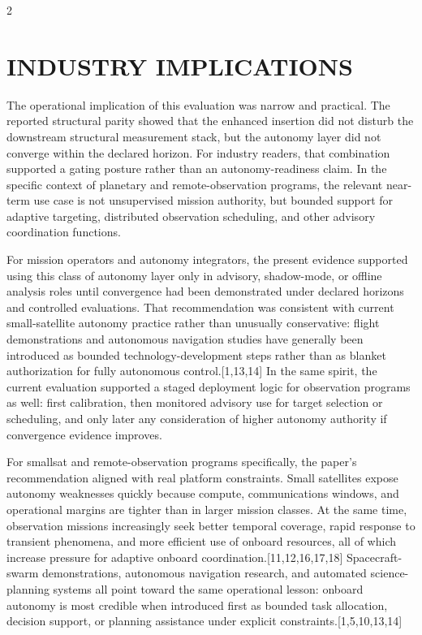 \documentclass[fleqn,10pt,letterpaper]{article}
\begin{document}
\begin{multicols}{2}
\section{INDUSTRY IMPLICATIONS}

The operational implication of this evaluation was narrow and practical. The reported structural parity showed that the enhanced insertion did not disturb the downstream structural measurement stack, but the autonomy layer did not converge within the declared horizon. For industry readers, that combination supported a gating posture rather than an autonomy-readiness claim. In the specific context of planetary and remote-observation programs, the relevant near-term use case is not unsupervised mission authority, but bounded support for adaptive targeting, distributed observation scheduling, and other advisory coordination functions.

For mission operators and autonomy integrators, the present evidence supported using this class of autonomy layer only in advisory, shadow-mode, or offline analysis roles until convergence had been demonstrated under declared horizons and controlled evaluations. That recommendation was consistent with current small-satellite autonomy practice rather than unusually conservative: flight demonstrations and autonomous navigation studies have generally been introduced as bounded technology-development steps rather than as blanket authorization for fully autonomous control.[1,13,14] In the same spirit, the current evaluation supported a staged deployment logic for observation programs as well: first calibration, then monitored advisory use for target selection or scheduling, and only later any consideration of higher autonomy authority if convergence evidence improves.

For smallsat and remote-observation programs specifically, the paper's recommendation aligned with real platform constraints. Small satellites expose autonomy weaknesses quickly because compute, communications windows, and operational margins are tighter than in larger mission classes. At the same time, observation missions increasingly seek better temporal coverage, rapid response to transient phenomena, and more efficient use of onboard resources, all of which increase pressure for adaptive onboard coordination.[11,12,16,17,18] Spacecraft-swarm demonstrations, autonomous navigation research, and automated science-planning systems all point toward the same operational lesson: onboard autonomy is most credible when introduced first as bounded task allocation, decision support, or planning assistance under explicit constraints.[1,5,10,13,14]


\end{multicols}
\end{document}
